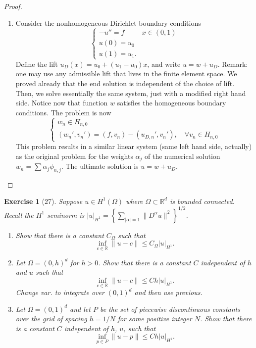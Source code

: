 \documentclass[letterpaper,twoside,11pt]{article}
\theoremstyle{mystyle}
\newtheorem*{exercise}{Exercise}
\newcommand{\R}{{\mathbb R}}
\newcommand{\cbk}{\color{black}}
\begin{document}
\begin{proof}
\begin{enumerate}
    \item Consider the nonhomogeneous Dirichlet boundary conditions
    \[\left\{ {\begin{array}{*{20}{l}}
      -u''=f & x \in (0,1)\\[.2cm]
      u(0) = u_0\\[.2cm]
      u(1) = u_1.
    \end{array}} \right.\]
    Define the lift $u_D(x) = u_0 + (u_1-u_0)x$, and write \(u = w + u_D\). Remark: one may use any admissible lift that lives in the finite element space. We proved already that the end solution is independent of the choice of lift. Then, we solve essentially the same system, just with a modified right hand side. Notice now that function $w$ satisfies the homogeneous boundary conditions. The problem is now 
    \[\left\{ {\begin{array}{*{20}{l}}
      {{w_n} \in {H_{n,0}}} \\[.2cm] 
      {\left( {{w_n}',{v_n}'} \right) = \left( {f,{v_n}} \right) - \left( {{u_{D,n}}',{v_n}'} \right),\quad \forall {v_n} \in {H_{n,0}}} 
    \end{array}} \right.\]
    This problem results in a similar linear system (same left hand side, actually) as the original problem for the weights $\alpha_j$ of the numerical solution $w_n=\sum\alpha_j \phi_{n,j}$. The ultimate solution is $u = w + u_D$. 
  \end{enumerate}
\end{proof}
\cbk 







\newpage 
\begin{exercise}[27]
  Suppose $u \in H^1\left( \Omega \right)$ where $\Omega\subset \R^d$ is bounded connected. Recall the $H^1$ seminorm is $|u|_{H^1} = \left\{ \sum_{|\alpha| = 1} \|D^\alpha u \|^2 \right\}^{1/2}$. 
  \begin{enumerate}
    \item Show that there is a constant $C_\Omega$ such that 
    \[\inf_{c\in \R} \|u-c\| \leq C_\Omega |u|_{H^1}.\]
    \item Let $\Omega = \left( 0, h \right)^d$ for $h > 0$. Show that there is a constant $C$ independent of $h$ and $u$ such that 
    \[\inf_{c\in \R} \|u-c\| \leq Ch |u|_{H^1}.\]
    Change var. to integrate over $(0,1)^d$ and then use previous. 
    \item Let $\Omega = \left( 0,1 \right)^d$ and let $P$ be the set of piecewise discontinuous constants over the grid of spacing $h = 1/N$ for some positive integer $N$. Show that there is a constant $C$ independent of $h$, $u$, such that 
    \[\inf_{p\in P} \|u-p\| \leq Ch |u|_{H^1}.\]
  \end{enumerate}
\end{exercise}
\end{document}
